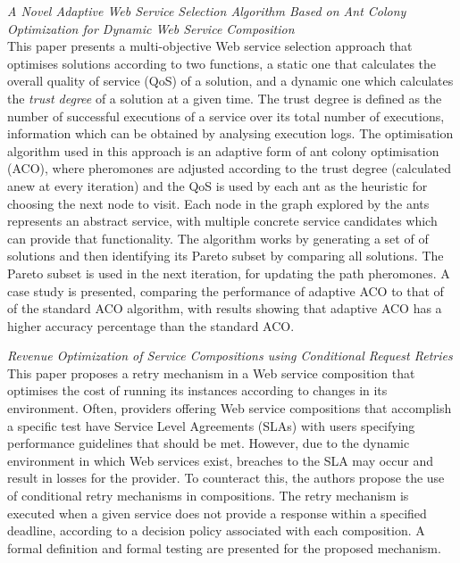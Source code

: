 \textit{A Novel Adaptive Web Service Selection Algorithm Based on Ant Colony Optimization for Dynamic Web Service Composition \cite{wang2014novel}}\\
This paper presents a multi-objective Web service selection approach that optimises solutions according to two functions, a static one that calculates the overall quality of service (QoS) of a solution, and a dynamic one which calculates the \textit{trust degree} of a solution at a given time. The trust degree is defined as the number of successful executions of a service over its total number of executions, information which can be obtained by analysing execution logs. The optimisation algorithm used in this approach is an adaptive form of ant colony optimisation (ACO), where pheromones are adjusted according to the trust degree (calculated anew at every iteration) and the QoS is used by each ant as the heuristic for choosing the next node to visit. Each node in the graph explored by the ants represents an abstract service, with multiple concrete service candidates which can provide that functionality. The algorithm works by generating a set of of solutions and then identifying its Pareto subset by comparing all solutions. The Pareto subset is used in the next iteration, for updating the path pheromones. A case study is presented, comparing the performance of adaptive ACO to that of of the standard ACO algorithm, with results showing that adaptive ACO has a higher accuracy percentage than the standard ACO.

\textit{Revenue Optimization of Service Compositions using Conditional Request Retries \cite{berg2013revenue}}\\
This paper proposes a retry mechanism in a Web service composition that optimises the cost of running its instances according to changes in its environment.
Often, providers offering Web service compositions that accomplish a specific test have Service Level Agreements (SLAs) with users specifying performance
guidelines that should be met. However, due to the dynamic environment in which Web services exist, breaches to the SLA may occur and result in losses
for the provider. To counteract this, the authors propose the use of conditional retry mechanisms in compositions. The retry mechanism is executed when
a given service does not provide a response within a specified deadline, according to a decision policy associated with each composition. A formal definition
and formal testing are presented for the proposed mechanism.

